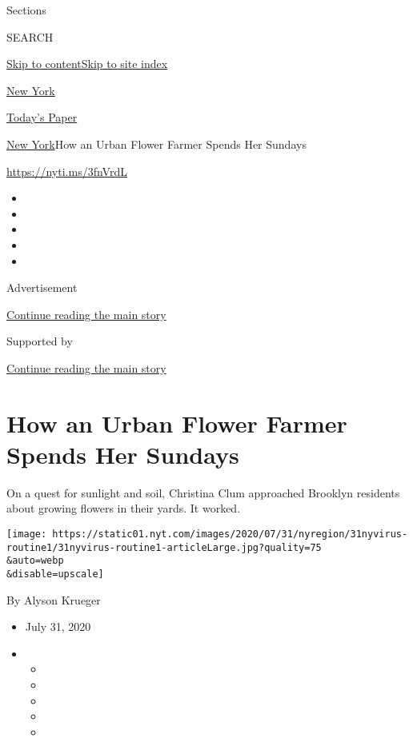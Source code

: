 Sections

SEARCH

\protect\hyperlink{site-content}{Skip to
content}\protect\hyperlink{site-index}{Skip to site index}

\href{https://www.nytimes.com/section/nyregion}{New York}

\href{https://myaccount.nytimes.com/auth/login?response_type=cookie\&client_id=vi}{}

\href{https://www.nytimes.com/section/todayspaper}{Today's Paper}

\href{/section/nyregion}{New York}\textbar{}How an Urban Flower Farmer
Spends Her Sundays

\url{https://nyti.ms/3fnVrdL}

\begin{itemize}
\item
\item
\item
\item
\item
\end{itemize}

Advertisement

\protect\hyperlink{after-top}{Continue reading the main story}

Supported by

\protect\hyperlink{after-sponsor}{Continue reading the main story}

\hypertarget{how-an-urban-flower-farmer-spends-her-sundays}{%
\section{How an Urban Flower Farmer Spends Her
Sundays}\label{how-an-urban-flower-farmer-spends-her-sundays}}

On a quest for sunlight and soil, Christina Clum approached Brooklyn
residents about growing flowers in their yards. It worked.

\texttt{[image: https://static01.nyt.com/images/2020/07/31/nyregion/31nyvirus-routine1/31nyvirus-routine1-articleLarge.jpg?quality=75\\\&auto=webp\\\&disable=upscale]}

By Alyson Krueger

\begin{itemize}
\item
  July 31, 2020
\item
  \begin{itemize}
  \item
  \item
  \item
  \item
  \item
  \end{itemize}
\end{itemize}

